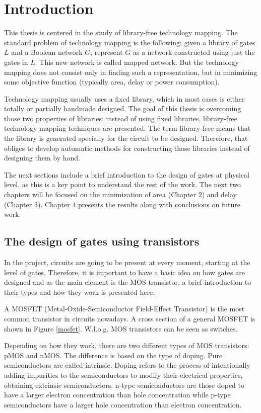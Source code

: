 \documentclass{fmetfm}
\begin{document}
\chapter{Introduction}
This thesis is centered in the study of library-free technology mapping. The standard problem of technology mapping is the following: given a library of gates $L$ and a Boolean network $G$, represent $G$ as a network constructed using just the gates in $L$. This new network is called mapped network. But the technology mapping does not consist only in finding such a representation, but in minimizing some objective function (typically area, delay or power consumption).

Technology mapping usually uses a fixed library, which in most cases is either totally or partially handmade designed. The goal of this thesis is overcoming those two properties of libraries: instead of using fixed libraries, library-free technology mapping techniques are presented. The term library-free means that the library is generated specially for the circuit to be designed. Therefore, that obliges to develop automatic methods for constructing those libraries instead of designing them by hand.

The next sections include a brief introduction to the design of gates at physical level, as this is a key point to understand the rest of the work. The next two chapters will be focused on the minimization of area (Chapter 2) and delay (Chapter 3). Chapter 4 presents the results along with conclusions on future work.

\section{The design of gates using transistors}

In the project, circuits are going to be present at every moment, starting at the level of gates. Therefore, it is important to have a basic idea on how gates are designed and as the main element is the MOS transistor, a brief introduction to their types and how they work is presented here.

A MOSFET (Metal-Oxide-Semiconductor Field-Effect Transistor) is the most common transistor in circuits nowadays. A cross section of a general MOSFET is shown in Figure \ref{mosfet}. W.l.o.g. MOS transistors can be seen as switches.


Depending on how they work, there are two different types of MOS transistors: pMOS and nMOS. The difference is based on the type of doping. Pure semiconductors are called intrinsic. Doping refers to the process of intentionally adding impurities to the semiconductors to modify their electrical properties, obtaining extrinsic semiconductors. n-type semiconductors are those doped to have a larger electron concentration than hole concentration while p-type semiconductors have a larger hole concentration than electron concentration.
\end{document}
